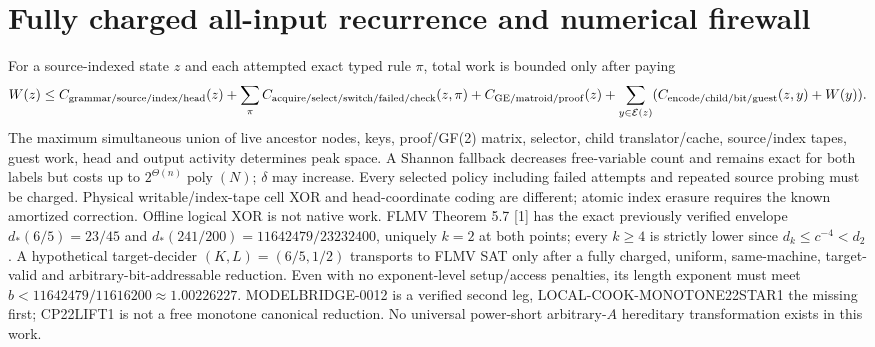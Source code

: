 \documentclass[10pt]{article}
\begin{document}
\section{Fully charged all-input recurrence and numerical firewall}
For a source-indexed state $z$ and each attempted exact typed rule $\pi$, total work is bounded only after paying
\[
W(z)\le C_{\rm grammar/source/index/head}(z)
+\sum_{\pi}C_{\rm acquire/select/switch/failed/check}(z,\pi)
+C_{\rm GE/matroid/proof}(z)
+\sum_{y\in{\cal E}(z)}(C_{\rm encode/child/bit/guest}(z,y)+W(y)).
\]
The maximum simultaneous union of live ancestor nodes, keys, proof/GF(2) matrix, selector, child translator/cache, source/index tapes, guest work, head and output activity determines peak space. A Shannon fallback decreases free-variable count and remains exact for both labels but costs up to $2^{\Theta(n)}\operatorname{poly}(N)$; $\delta$ may increase. Every selected policy including failed attempts and repeated source probing must be charged. Physical writable/index-tape cell XOR and head-coordinate coding are different; atomic index erasure requires the known amortized correction. Offline logical XOR is not native work.
FLMV Theorem 5.7 [1] has the exact previously verified envelope $d_*(6/5)=23/45$ and $d_*(241/200)=11642479/23232400$, uniquely $k=2$ at both points; every $k\ge4$ is strictly lower since $d_k\le c^{-4}<d_2$. A hypothetical target-decider $(K,L)=(6/5,1/2)$ transports to FLMV SAT only after a fully charged, uniform, same-machine, target-valid and arbitrary-bit-addressable reduction. Even with no exponent-level setup/access penalties, its length exponent must meet $b<11642479/11616200\approx1.00226227$. MODELBRIDGE-0012 is a verified second leg, LOCAL-COOK-MONOTONE22STAR1 the missing first; CP22LIFT1 is not a free monotone canonical reduction. No universal power-short arbitrary-$A$ hereditary transformation exists in this work.
\end{document}
